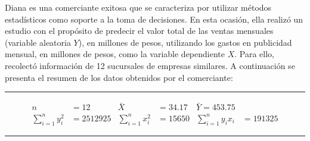 \documentclass[../main.tex]{subfiles}
\begin{document}
Diana es una comerciante exitosa que se caracteriza por utilizar métodos estadísticos como soporte a la toma de decisiones. En esta ocasión, ella realizó un estudio con el propósito de predecir el valor total de las ventas mensuales (variable aleatoria $Y$), en millones de pesos, utilizando los gastos en publicidad mensual, en millones de pesos, como la variable dependiente $X$. Para ello, recolectó información de 12 sucursales de empresas similares. A continuación se presenta el resumen de los datos obtenidos por el comerciante:

\bigskip
\hrule
\begin{align*}
	n &= 12 & \bar{X} &= 34.17 & \bar{Y} = 453.75 \\
	\sum_{i = 1}^{n} y_{i}^2 &= 2512925 & 	\sum_{i = 1}^{n} x_{i}^2 &= 15650 & \sum_{i = 1}^{n} y_{i}x_{i} &= 191325
\end{align*}
\hrule
\bigskip
\end{document}
